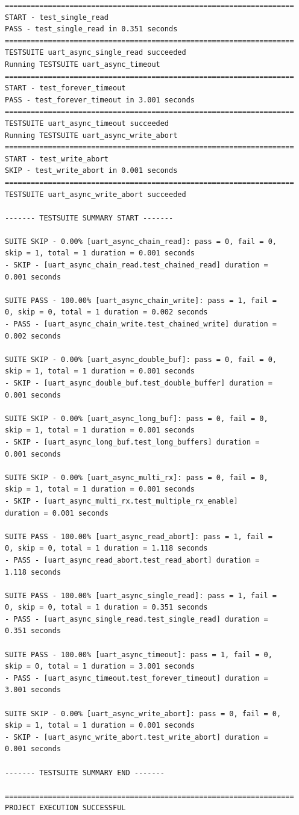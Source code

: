 \documentclass[11pt,a4paper,oneside]{article}
\begin{document}
\begin{lstlisting}
===================================================================
START - test_single_read
PASS - test_single_read in 0.351 seconds
===================================================================
TESTSUITE uart_async_single_read succeeded
Running TESTSUITE uart_async_timeout
===================================================================
START - test_forever_timeout
PASS - test_forever_timeout in 3.001 seconds
===================================================================
TESTSUITE uart_async_timeout succeeded
Running TESTSUITE uart_async_write_abort
===================================================================
START - test_write_abort
SKIP - test_write_abort in 0.001 seconds
===================================================================
TESTSUITE uart_async_write_abort succeeded

------- TESTSUITE SUMMARY START -------

SUITE SKIP - 0.00% [uart_async_chain_read]: pass = 0, fail = 0,
skip = 1, total = 1 duration = 0.001 seconds
- SKIP - [uart_async_chain_read.test_chained_read] duration =
0.001 seconds

SUITE PASS - 100.00% [uart_async_chain_write]: pass = 1, fail =
0, skip = 0, total = 1 duration = 0.002 seconds
- PASS - [uart_async_chain_write.test_chained_write] duration =
0.002 seconds

SUITE SKIP - 0.00% [uart_async_double_buf]: pass = 0, fail = 0,
skip = 1, total = 1 duration = 0.001 seconds
- SKIP - [uart_async_double_buf.test_double_buffer] duration =
0.001 seconds

SUITE SKIP - 0.00% [uart_async_long_buf]: pass = 0, fail = 0,
skip = 1, total = 1 duration = 0.001 seconds
- SKIP - [uart_async_long_buf.test_long_buffers] duration =
0.001 seconds

SUITE SKIP - 0.00% [uart_async_multi_rx]: pass = 0, fail = 0,
skip = 1, total = 1 duration = 0.001 seconds
- SKIP - [uart_async_multi_rx.test_multiple_rx_enable]
duration = 0.001 seconds

SUITE PASS - 100.00% [uart_async_read_abort]: pass = 1, fail =
0, skip = 0, total = 1 duration = 1.118 seconds
- PASS - [uart_async_read_abort.test_read_abort] duration =
1.118 seconds

SUITE PASS - 100.00% [uart_async_single_read]: pass = 1, fail =
0, skip = 0, total = 1 duration = 0.351 seconds
- PASS - [uart_async_single_read.test_single_read] duration =
0.351 seconds

SUITE PASS - 100.00% [uart_async_timeout]: pass = 1, fail = 0,
skip = 0, total = 1 duration = 3.001 seconds
- PASS - [uart_async_timeout.test_forever_timeout] duration =
3.001 seconds

SUITE SKIP - 0.00% [uart_async_write_abort]: pass = 0, fail = 0,
skip = 1, total = 1 duration = 0.001 seconds
- SKIP - [uart_async_write_abort.test_write_abort] duration =
0.001 seconds

------- TESTSUITE SUMMARY END -------

===================================================================
PROJECT EXECUTION SUCCESSFUL
\end{lstlisting}
\end{document}
